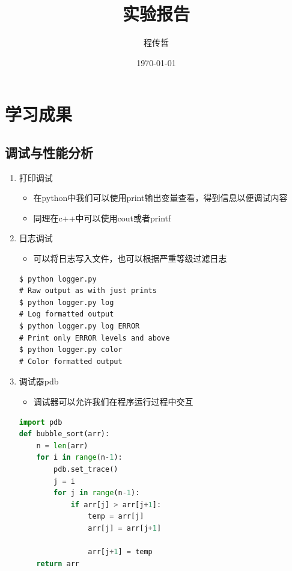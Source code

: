 \documentclass[a4paper, 12pt]{article}
\begin{document}
    {\huge\title{实验报告}}
    {\large\author{程传哲}}
    \date{\today}
    \maketitle
\section{学习成果}

\subsection{调试与性能分析}
\begin{enumerate}
  \item{\large 打印调试}
    \begin{itemize}
        \item 在python中我们可以使用print输出变量查看，得到信息以便调试内容
        \item 同理在c++中可以使用cout或者printf
    \end{itemize}
  \item{\large 日志调试}
    \begin{itemize}
        \item 可以将日志写入文件，也可以根据严重等级过滤日志
    \end{itemize}
    \begin{lstlisting}
$ python logger.py
# Raw output as with just prints
$ python logger.py log
# Log formatted output
$ python logger.py log ERROR
# Print only ERROR levels and above
$ python logger.py color
# Color formatted output
    \end{lstlisting}
  \item{\large 调试器pdb}
    \begin{itemize}
        \item 调试器可以允许我们在程序运行过程中交互
    \end{itemize}
    \begin{lstlisting}[language = python]
import pdb
def bubble_sort(arr):
    n = len(arr)
    for i in range(n-1):
        pdb.set_trace()
        j = i
        for j in range(n-1):
            if arr[j] > arr[j+1]:
                temp = arr[j]
                arr[j] = arr[j+1]

                arr[j+1] = temp
    return arr


\end{lstlisting}
\end{enumerate}
\end{document}
